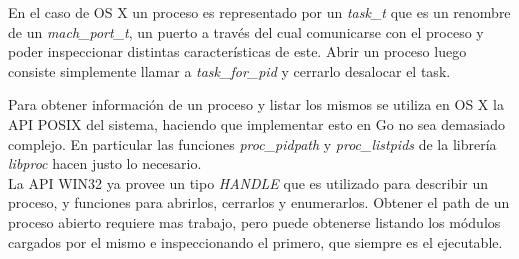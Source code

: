 En el caso de OS X un proceso es representado por un \textit{task\_t} que es un
renombre de un \textit{mach\_port\_t}, un puerto a través del cual comunicarse
con el proceso y poder inspeccionar distintas características de este. Abrir un
proceso luego consiste simplemente llamar a \textit{task\_for\_pid} y cerrarlo
desalocar el task.

Para obtener información de un proceso y listar los mismos se utiliza en OS X
la API POSIX del sistema, haciendo que implementar esto en Go no sea demasiado
complejo. En particular las funciones \textit{proc\_pidpath} y
\textit{proc\_listpids} de la librería \textit{libproc} hacen justo lo
necesario.\\

La API WIN32 ya provee un tipo \textit{HANDLE} que es utilizado para describir
un proceso, y funciones para abrirlos, cerrarlos y enumerarlos. Obtener el path
de un proceso abierto requiere mas trabajo, pero puede obtenerse listando los
módulos cargados por el mismo e inspeccionando el primero, que siempre es el
ejecutable.\\

